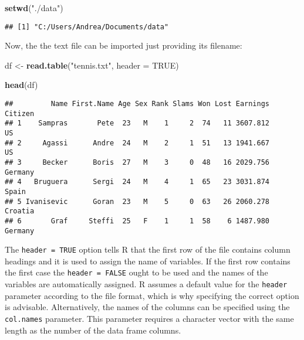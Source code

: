 \documentclass[]{book}
\newenvironment{Shaded}{\begin{snugshade}}{\end{snugshade}}
\newcommand{\KeywordTok}[1]{\textcolor[rgb]{0.13,0.29,0.53}{\textbf{{#1}}}}
\newcommand{\DataTypeTok}[1]{\textcolor[rgb]{0.13,0.29,0.53}{{#1}}}
\newcommand{\StringTok}[1]{\textcolor[rgb]{0.31,0.60,0.02}{{#1}}}
\newcommand{\OtherTok}[1]{\textcolor[rgb]{0.56,0.35,0.01}{{#1}}}
\newcommand{\NormalTok}[1]{{#1}}
\begin{document}
\begin{Shaded}
\begin{Highlighting}[]
\KeywordTok{setwd}\NormalTok{(}\StringTok{"./data"}\NormalTok{) }
\end{Highlighting}
\end{Shaded}

\begin{verbatim}
## [1] "C:/Users/Andrea/Documents/data"
\end{verbatim}

Now, the the text file can be imported just providing its filename:

\begin{Shaded}
\begin{Highlighting}[]
\NormalTok{df <-}\StringTok{ }\KeywordTok{read.table}\NormalTok{(}\StringTok{"tennis.txt"}\NormalTok{, }\DataTypeTok{header =} \OtherTok{TRUE}\NormalTok{)}
\end{Highlighting}
\end{Shaded}

\begin{Shaded}
\begin{Highlighting}[]
\KeywordTok{head}\NormalTok{(df)}
\end{Highlighting}
\end{Shaded}

\begin{verbatim}
##         Name First.Name Age Sex Rank Slams Won Lost Earnings Citizen
## 1    Sampras       Pete  23   M    1     2  74   11 3607.812      US
## 2     Agassi      Andre  24   M    2     1  51   13 1941.667      US
## 3     Becker      Boris  27   M    3     0  48   16 2029.756 Germany
## 4   Bruguera      Sergi  24   M    4     1  65   23 3031.874   Spain
## 5 Ivanisevic      Goran  23   M    5     0  63   26 2060.278 Croatia
## 6       Graf     Steffi  25   F    1     1  58    6 1487.980 Germany
\end{verbatim}

The \texttt{header\ =\ TRUE} option tells R that the first row of the
file contains column headings and it is used to assign the name of
variables. If the first row contains the first case the
\texttt{header\ =\ FALSE} ought to be used and the names of the
variables are automatically assigned. R assumes a default value for the
\texttt{header} parameter according to the file format, which is why
specifying the correct option is advisable. Alternatively, the names of
the columns can be specified using the \texttt{col.names} parameter.
This parameter requires a character vector with the same length as the
number of the data frame columns.
\end{document}
